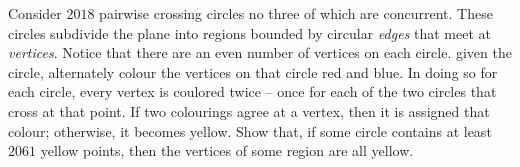 Consider $2018$ pairwise crossing circles no three of which are concurrent.
These circles subdivide the plane into regions bounded by circular \textit{edges} that meet at \textit{vertices}.
Notice that there are an even number of vertices on each circle.
given the circle, alternately colour the vertices on that circle red and blue.
In doing so for each circle, every vertex is coulored twice -- once for each of the two circles that cross at that point.
If two colourings agree at a vertex, then it is assigned that colour; otherwise, it becomes yellow.
Show that, if some circle contains at least $2061$ yellow points, then the vertices of some region are all yellow.
